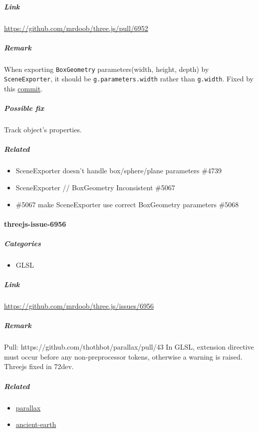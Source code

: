 \documentclass[]{article}
\begin{document}
\subparagraph{Link}\label{link-12}

\url{https://github.com/mrdoob/three.js/pull/6952}

\subparagraph{Remark}\label{remark-12}

When exporting \texttt{BoxGeometry} parameters(width, height, depth) by
\texttt{SceneExporter}, it should be \texttt{g.parameters.width} rather
than \texttt{g.width}. Fixed by this
\href{https://github.com/dubejf/three.js/commit/b5b79a7a6aa4b42846f89e4852f36719543a3438}{commit}.

\subparagraph{Possible fix}\label{possible-fix-10}

Track object's properties.

\subparagraph{Related}\label{related-2}

\begin{itemize}
\item
  SceneExporter doesn't handle box/sphere/plane parameters \#4739
\item
  SceneExporter // BoxGeometry Inconsistent \#5067
\item
  \#5067 make SceneExporter use correct BoxGeometry parameters \#5068
\end{itemize}

\paragraph{threejs-issue-6956}\label{threejs-issue-6956}

\subparagraph{Categories}\label{categories-13}

\begin{itemize}
\itemsep1pt\parskip0pt
\item
  GLSL
\end{itemize}

\subparagraph{Link}\label{link-13}

\url{https://github.com/mrdoob/three.js/issues/6956}

\subparagraph{Remark}\label{remark-13}

Pull: https://github.com/thothbot/parallax/pull/43 In GLSL, extension
directive must occur before any non-preprocessor tokens, otherwise a
warning is raised. Threejs fixed in 72dev.

\subparagraph{Related}\label{related-3}

\begin{itemize}
\itemsep1pt\parskip0pt
\item
  \href{https://github.com/thothbot/parallax/pull/43}{parallax}
\item
  \href{https://github.com/typpo/ancient-earth/commit/91f9d75ab45db8e7ba3d2e156e313f079f6826ed}{ancient-earth}
\end{itemize}
\end{document}
